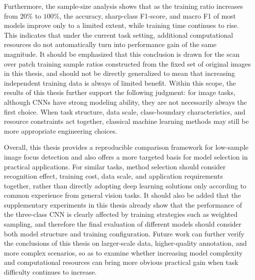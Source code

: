 \par Furthermore, the sample-size analysis shows that as the training ratio
increases from $20\%$ to $100\%$, the accuracy, sharp-class F1-score, and
macro F1 of most models improve only to a limited extent, while training time
continues to rise. This indicates that under the current task setting,
additional computational resources do not automatically turn into performance
gain of the same magnitude. It should be emphasized that this conclusion is
drawn for the scan over patch training sample ratios constructed from the fixed
set of original images in this thesis, and should not be directly generalized
to mean that increasing independent training data is always of limited benefit.
Within this scope, the results of this thesis further support the following
judgment: for image tasks, although CNNs have strong modeling ability, they are
not necessarily always the first choice. When task structure, data scale,
class-boundary characteristics, and resource constraints act together,
classical machine learning methods may still be more appropriate engineering
choices.

\par Overall, this thesis provides a reproducible comparison framework for
low-sample image focus detection and also offers a more targeted basis for
model selection in practical applications. For similar tasks, method selection
should consider recognition effect, training cost, data scale, and application
requirements together, rather than directly adopting deep learning solutions
only according to common experience from general vision tasks. It should also
be added that the supplementary experiments in this thesis already show that
the performance of the three-class CNN is clearly affected by training
strategies such as weighted sampling, and therefore the final evaluation of
different models should consider both model structure and training
configuration. Future work can further verify the conclusions of this thesis on
larger-scale data, higher-quality annotation, and more complex scenarios, so
as to examine whether increasing model complexity and computational resources
can bring more obvious practical gain when task difficulty continues to
increase.
